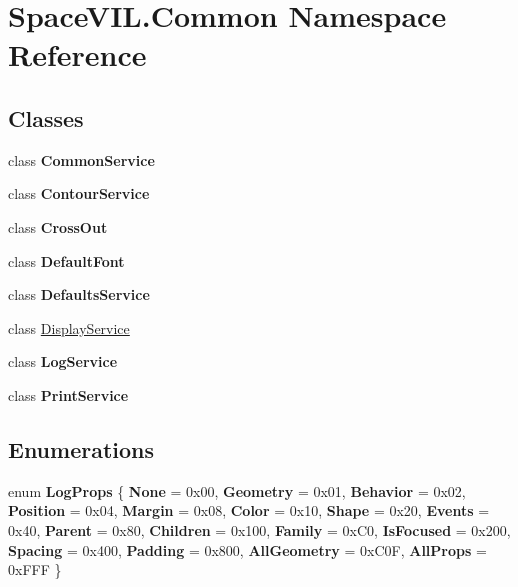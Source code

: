 \hypertarget{namespace_space_v_i_l_1_1_common}{}\section{Space\+V\+I\+L.\+Common Namespace Reference}
\label{namespace_space_v_i_l_1_1_common}
\subsection*{Classes}
\begin{DoxyCompactItemize}
\item 
class {\bfseries Common\+Service}
\item 
class {\bfseries Contour\+Service}
\item 
class {\bfseries Cross\+Out}
\item 
class {\bfseries Default\+Font}
\item 
class {\bfseries Defaults\+Service}
\item 
class \mbox{\hyperlink{class_space_v_i_l_1_1_common_1_1_display_service}{Display\+Service}}
\item 
class {\bfseries Log\+Service}
\item 
class {\bfseries Print\+Service}
\end{DoxyCompactItemize}
\subsection*{Enumerations}
\begin{DoxyCompactItemize}
\item 
\mbox{\label{namespace_space_v_i_l_1_1_common_aa88ce883ae0722295af278daebeb9d31}} 
enum {\bfseries Log\+Props} \{ \newline
{\bfseries None} = 0x00, 
{\bfseries Geometry} = 0x01, 
{\bfseries Behavior} = 0x02, 
{\bfseries Position} = 0x04, 
\newline
{\bfseries Margin} = 0x08, 
{\bfseries Color} = 0x10, 
{\bfseries Shape} = 0x20, 
{\bfseries Events} = 0x40, 
\newline
{\bfseries Parent} = 0x80, 
{\bfseries Children} = 0x100, 
{\bfseries Family} = 0x\+C0, 
{\bfseries Is\+Focused} = 0x200, 
\newline
{\bfseries Spacing} = 0x400, 
{\bfseries Padding} = 0x800, 
{\bfseries All\+Geometry} = 0x\+C0F, 
{\bfseries All\+Props} = 0x\+F\+FF
 \}
\end{DoxyCompactItemize}
